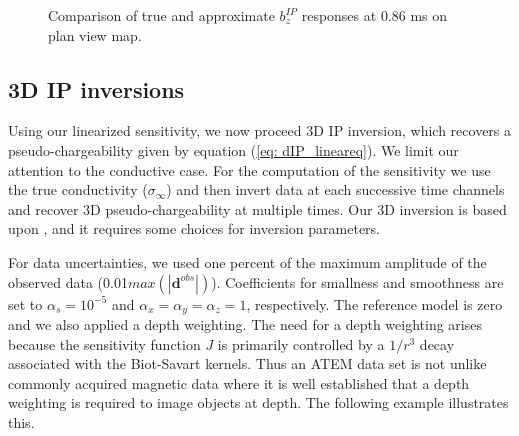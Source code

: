 \documentclass[extra,mreferee]{gji}
\newcommand{\siginf}{\sigma_\infty}
\begin{document}
\begin{figure}
  \caption{Comparison of true and approximate $b_z^{IP}$ responses at 0.86 ms on plan view map. }
  \label{F:EquivPeta_True_Approx}
\end{figure}
\clearpage

\subsection{3D IP inversions}
Using our linearized sensitivity, we now proceed 3D IP inversion, which recovers a pseudo-chargeability given by equation (\ref{eq: dIP_lineareq}). 
We limit our attention to the conductive case. For the computation of the sensitivity we use the true conductivity ($\siginf$) and then invert data at each  successive time channels and recover 3D pseudo-chargeability at multiple times. 
Our 3D inversion is based upon \cite[]{doug1994,Li2000}, and it requires some choices for inversion parameters. 

For data uncertainties, we used one percent of the maximum amplitude of the observed data (0.01$max(|\mathbf{d}^{obs}|)$). Coefficients for smallness and smoothness are set to $\alpha_s=10^{-5}$ and $\alpha_x=\alpha_y=\alpha_z=1$, respectively. The reference model is zero and we also applied a depth weighting. 
The need for a depth weighting arises because the sensitivity function $J$ is primarily controlled by a $1/r^3$ decay associated with the Biot-Savart kernels.  Thus an ATEM data set is not unlike commonly acquired  magnetic data where it is well established that a depth weighting is required to image objects at depth. The following example illustrates this. 
\end{document}
